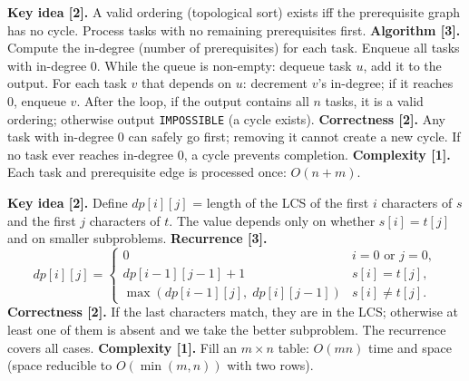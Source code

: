 \begin{solution}
\textbf{Key idea [2].} A valid ordering (topological sort) exists iff the prerequisite graph has no cycle. Process tasks with no remaining prerequisites first.
\textbf{Algorithm [3].} Compute the in-degree (number of prerequisites) for each task. Enqueue all tasks with in-degree 0. While the queue is non-empty: dequeue task $u$, add it to the output. For each task $v$ that depends on $u$: decrement $v$'s in-degree; if it reaches 0, enqueue $v$. After the loop, if the output contains all $n$ tasks, it is a valid ordering; otherwise output \texttt{IMPOSSIBLE} (a cycle exists).
\textbf{Correctness [2].} Any task with in-degree 0 can safely go first; removing it cannot create a new cycle. If no task ever reaches in-degree 0, a cycle prevents completion.
\textbf{Complexity [1].} Each task and prerequisite edge is processed once: $O(n+m)$.
\end{solution}

\begin{solution}
\textbf{Key idea [2].} Define $dp[i][j]$ = length of the LCS of the first $i$ characters of $s$ and the first $j$ characters of $t$. The value depends only on whether $s[i] = t[j]$ and on smaller subproblems.
\textbf{Recurrence [3].}
\[
dp[i][j] =
\begin{cases}
0 & i=0 \text{ or } j=0, \\
dp[i-1][j-1]+1 & s[i]=t[j], \\
\max(dp[i-1][j],\; dp[i][j-1]) & s[i]\ne t[j].
\end{cases}
\]
\textbf{Correctness [2].} If the last characters match, they are in the LCS; otherwise at least one of them is absent and we take the better subproblem. The recurrence covers all cases.
\textbf{Complexity [1].} Fill an $m\times n$ table: $O(mn)$ time and space (space reducible to $O(\min(m,n))$ with two rows).
\end{solution}
\fi


